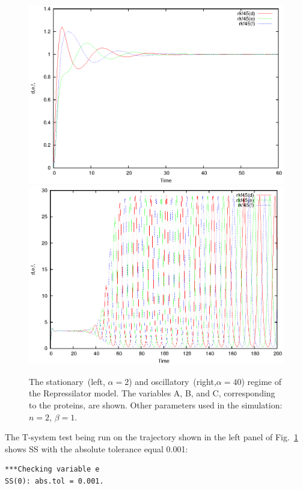 \documentclass[11pt,a4paper]{article}
\begin{document}
\begin{figure}[h]
  \centering
  \includegraphics[scale=0.45]{rep_ss}
  \includegraphics[scale=0.45]{rep_os}
  \caption{The stationary~(left, $\alpha=2$) and oscillatory~(right,$\alpha=40$)
    regime of the Repressilator model. The variables A, B, and C, corresponding to
    the proteins, are shown. Other parameters used in the simulation: $n=2$,
    $\beta=1$.}
\label{fig:rep}
\end{figure}

The T-system test being run on the trajectory shown in the left panel of
Fig.~\ref{fig:rep} shows SS with the absolute tolerance equal 0.001:
\begin{verbatim}
***Checking variable e
SS(0): abs.tol = 0.001.
\end{verbatim}
\end{document}
